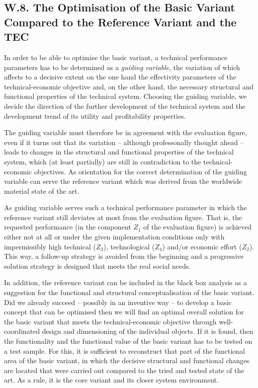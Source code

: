 \documentclass[11pt,a4paper]{article}
\begin{document}
\subsection*{W.8. The Optimisation of the Basic Variant Compared to the
  Reference Variant and the TEC}

In order to be able to optimise the basic variant, a technical performance
parameters has to be determined as a \emph{guiding variable}, the variation of
which affects to a decisive extent on the one hand the effectivity parameters
of the technical-economic objective and, on the other hand, the necessary
structural and functional properties of the technical system. Choosing the
guiding variable, we decide the direction of the further development of the
technical system and the development trend of its utility and profitability
properties.

The guiding variable must therefore be in agreement with the evaluation figure,
even if it turns out that its variation -- although professonally thought
ahead -- leads to changes in the structural and functional properties of the
technical system, which (at least partially) are still in contradiction to the
technical-economic objectives. As orientation for the correct determination of
the guiding variable can serve the reference variant which was derived from
the worldwide material state of the art.

As guiding variable serves such a technical performance parameter in which the
reference variant still deviates at most from the evaluation figure.  That is,
the requested performance (in the component $Z_1$ of the evaluation figure) is
achieved either not at all or under the given implementation conditions only
with impermissibly high technical ($Z_3$), technological ($Z_4$) and/or
economic effort ($Z_2$).  This way, a follow-up strategy is avoided from the
beginning and a progressive solution strategy is designed that meets the real
social needs.

In addition, the reference variant can be included in the black box analysis
as a suggestion for the functional and structural conceptualisation of the
basic variant. Did we already succeed -- possibly in an inventive way -- to
develop a basic concept that can be optimised then we will find an optimal
overall solution for the basic variant that meets the technical-economic
objective through well-coordinated design and dimensioning of the individual
objects. If it is found, then the functionality and the functional value of
the basic variant has to be tested on a test sample.  For this, it is
sufficient to reconstruct that part of the functional area of the basic
variant, in which the decisive structural and functional changes are located
that were carried out compared to the tried and tested state of the art. As a
rule, it is the core variant and its closer system environment.
\end{document}

